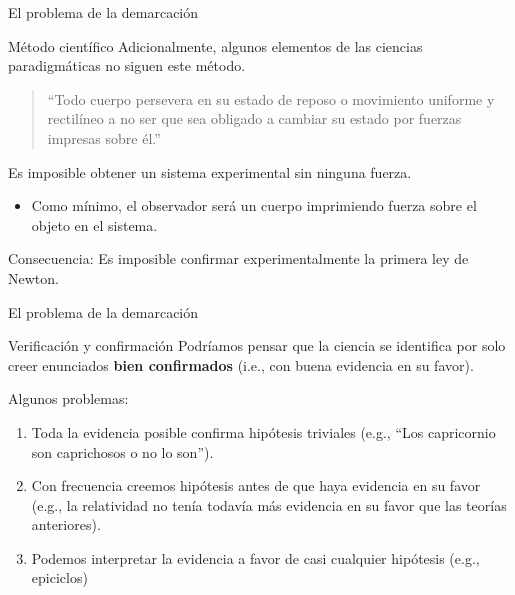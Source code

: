\documentclass[
  ignorenonframetext,
]{beamer}
\providecommand{\tightlist}{%
  \setlength{\itemsep}{0pt}\setlength{\parskip}{0pt}}
\begin{document}
\begin{frame}{El problema de la demarcación}
\protect\hypertarget{el-problema-de-la-demarcaciuxf3n-2}{}
\begin{block}{Método científico}
\protect\hypertarget{muxe9todo-cientuxedfico-1}{}
Adicionalmente, algunos elementos de las ciencias paradigmáticas no
siguen este método.

\begin{quote}
``Todo cuerpo persevera en su estado de reposo o movimiento uniforme y
rectilíneo a no ser que sea obligado a cambiar su estado por fuerzas
impresas sobre él.''
\end{quote}

Es imposible obtener un sistema experimental sin ninguna fuerza.

\begin{itemize}
\tightlist
\item
  Como mínimo, el observador será un cuerpo imprimiendo fuerza sobre el
  objeto en el sistema.
\end{itemize}

Consecuencia: Es imposible confirmar experimentalmente la primera ley de
Newton.
\end{block}
\end{frame}

\begin{frame}{El problema de la demarcación}
\protect\hypertarget{el-problema-de-la-demarcaciuxf3n-3}{}
\begin{block}{Verificación y confirmación}
\protect\hypertarget{verificaciuxf3n-y-confirmaciuxf3n}{}
Podríamos pensar que la ciencia se identifica por solo creer enunciados
\textbf{bien confirmados} (i.e., con buena evidencia en su favor).

Algunos problemas:

\begin{enumerate}
\tightlist
\item
  Toda la evidencia posible confirma hipótesis triviales (e.g., ``Los
  capricornio son caprichosos o no lo son'').
\item
  Con frecuencia creemos hipótesis antes de que haya evidencia en su
  favor (e.g., la relatividad no tenía todavía más evidencia en su favor
  que las teorías anteriores).
\item
  Podemos interpretar la evidencia a favor de casi cualquier hipótesis
  (e.g., epiciclos)
\end{enumerate}
\end{block}
\end{frame}
\end{document}
